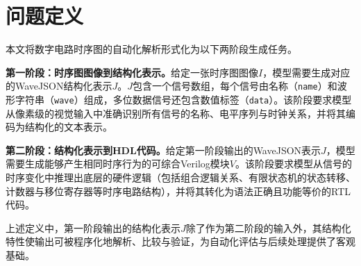 \section{问题定义}\label{sec:problem-def}

本文将数字电路时序图的自动化解析形式化为以下两阶段生成任务。

\textbf{第一阶段：时序图图像到结构化表示。}给定一张时序图图像$I$，模型需要生成对应的WaveJSON结构化表示$J$。$J$包含一个信号数组，每个信号由名称（\texttt{name}）和波形字符串（\texttt{wave}）组成，多位数据信号还包含数值标签（\texttt{data}）。该阶段要求模型从像素级的视觉输入中准确识别所有信号的名称、电平序列与时钟关系，并将其编码为结构化的文本表示。

\textbf{第二阶段：结构化表示到HDL代码。}给定第一阶段输出的WaveJSON表示$J$，模型需要生成能够产生相同时序行为的可综合Verilog模块$V$。该阶段要求模型从信号的时序变化中推理出底层的硬件逻辑（包括组合逻辑关系、有限状态机的状态转移、计数器与移位寄存器等时序电路结构），并将其转化为语法正确且功能等价的RTL代码。

上述定义中，第一阶段输出的结构化表示$J$除了作为第二阶段的输入外，其结构化特性使输出可被程序化地解析、比较与验证，为自动化评估与后续处理提供了客观基础。
